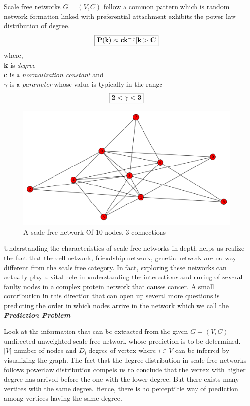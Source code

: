 \documentclass{article}
\begin{document}
Scale free networks $G=(V,C)$ follow a common pattern which is random network formation linked with preferential attachment exhibits the power law distribution of degree.
\begin{equation}
\fbox{$\bf P(k) \approx ck ^{-\gamma} | k>C$} 
\end{equation}
where, \\
\textbf{k} is \emph{degree},\\ 
\hspace{.18in}\textbf{c}  is a \emph{normalization constant} and \\
\textbf{$\gamma$} is a \emph{parameter} whose value is typically in the range 
\begin{equation}
\fbox{$\bf 2 <\gamma <3$}
\end{equation}
\begin{figure}[htp]
\centering
\includegraphics[scale=0.30]{Figures/LabelledNetwork.png}
\caption{A scale free network Of 10 nodes, 3 connections}
\label{}
\end{figure}

Understanding the characteristics of scale free networks in depth helps us realize the fact that the cell network, friendship network, genetic network are no way different from the scale free category. In fact, exploring these networks can actually play a vital role in understanding the interactions and curing of several faulty nodes in a complex protein network that causes cancer. A small contribution in this direction that can open up several more questions is predicting the order in which nodes arrive in the network which we call the \bf \emph{Prediction Problem}\rm .

Look at the information that can be extracted from the given $G = (V,C)$ undirected unweighted scale free  network whose prediction is to be determined. $|V|$ number of nodes and $D_i$ degree of vertex where $i \in V$ can be inferred by visualizing the graph. The fact that the degree distribution in scale free networks follows powerlaw distribution compels us to conclude that the vertex with higher degree has arrived before the one with the lower degree. But there exists many vertices with the same degree. Hence, there is no perceptible way of
prediction among vertices having the same degree.
\end{document}
